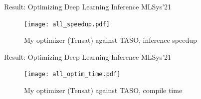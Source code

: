 \documentclass{beamer}
\begin{document}
  \begin{frame}{Result: Optimizing Deep Learning Inference}
    MLSys'21~\cite{tensat}
    \begin{figure}
      \texttt{[image: all\_speedup.pdf]}
      \caption*{My optimizer (Tensat) against TASO, inference speedup}
    \end{figure}
  \end{frame}

  \begin{frame}{Result: Optimizing Deep Learning Inference}
    MLSys'21~\cite{tensat}
    \begin{figure}
      \texttt{[image: all\_optim\_time.pdf]}
      \caption*{My optimizer (Tensat) against TASO, compile time}
    \end{figure}
  \end{frame}
  
\end{document}
